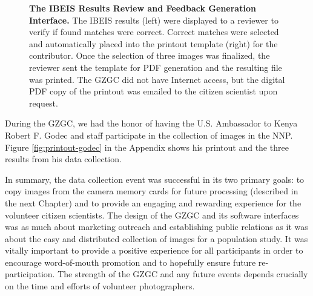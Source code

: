 \begin{figure}[t]%
    \centering
        \caption[The IBEIS Results Review and Feedback Generation Interface]{\textbf{The IBEIS Results Review and Feedback Generation Interface.}  The IBEIS results (left) were displayed to a reviewer to verify if found matches were correct.  Correct matches were selected and automatically placed into the printout template (right) for the contributor.  Once the selection of three images was finalized, the reviewer sent the template for PDF generation and the resulting file was printed.  The GZGC did not have Internet access, but the digital PDF copy of the printout was emailed to the citizen scientist upon request.}
        \label{fig:client-printout}
\end{figure}

During the GZGC, we had the honor of having the U.S. Ambassador to Kenya Robert F. Godec and staff participate in the collection of images in the NNP.  Figure \ref{fig:printout-godec} in the Appendix shows his printout and the three results from his data collection.

In summary, the data collection event was successful in its two primary goals: to copy images from the camera memory cards for future processing (described in the next Chapter) and to provide an engaging and rewarding experience for the volunteer citizen scientists.  The design of the GZGC and its software interfaces was as much about marketing outreach and establishing public relations as it was about the easy and distributed collection of images for a population study.  It was vitally important to provide a positive experience for all participants in order to encourage word-of-mouth promotion and to hopefully ensure future re-participation.  The strength of the GZGC and any future events depends crucially on the time and efforts of volunteer photographers.  %

